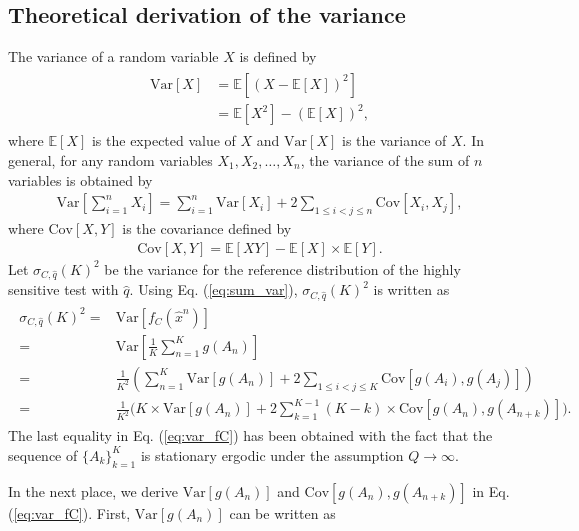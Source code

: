 \documentclass[dvipdfmx,english]{ampmt} %
\begin{document}
\subsection{Theoretical derivation of the variance}
The variance of a random variable $X$ is defined by
\begin{align}
\begin{split}\label{eq:var_def}
  \mathrm{Var}[X] &= \mathbb{E}[(X - \mathbb{E}[X])^2] \\
  &=\mathbb{E}[X^2] - (\mathbb{E}[X])^2,
\end{split}
\end{align}
where $\mathbb{E}[X]$ is the expected value of $X$ and $\mathrm{Var}[X]$ is the variance of $X$.
In general, for any random variables $X_1,X_2,\dots,X_n$, the variance of the sum of $n$ variables is obtained by
\begin{align}\label{eq:sum_var}
  \mathrm{Var}\left[\sum_{i=1}^{n} X_i \right] = \sum_{i=1}^{n} \mathrm{Var}[X_i] + 2 \sum_{1\leq i < j \leq n}\mathrm{Cov}[X_i, X_j],
\end{align}
where $\mathrm{Cov}[X,Y]$ is the covariance defined by
\begin{align}\label{eq:cov_def}
  \mathrm{Cov}[X, Y] = \mathbb{E}[XY] - \mathbb{E}[X] \times \mathbb{E}[Y].
\end{align}
Let $\sigma_{C,\hat{q}}(K)^2$ be the variance for the reference distribution of the highly sensitive test with $\hat{q}$.
Using Eq. (\ref{eq:sum_var}), $\sigma_{C,\hat{q}}(K)^2$ is written as
\begin{align}
\begin{split}\label{eq:var_fC}
  \sigma_{C,\hat{q}}(K)^2 =& \mathrm{Var} [f_C(\hat{x}^n)] \\
  =& \mathrm{Var} \left[ \frac{1}{K} \sum_{n=1}^{K} g(A_n) \right] \\
  =& \frac{1}{K^2} \left( \sum_{n=1}^{K} \mathrm{Var} [g(A_n)] + 2 \sum_{1 \leq i < j \leq K} \mathrm{Cov} [g(A_{i}), g(A_{j})] \right) \\
  =& \frac{1}{K^2} \Biggl( K \times \mathrm{Var} [g(A_n)] + 2\sum_{k=1}^{K-1}(K-k) \times \mathrm{Cov}[g(A_n),g(A_{n+k})] \Biggr).
\end{split}
\end{align}
The last equality in Eq. (\ref{eq:var_fC}) has been obtained with the fact that the sequence of $\{A_k\}_{k=1}^{K}$ is stationary ergodic under the assumption $Q\to\infty$.
\par
In the next place, we derive $\mathrm{Var} [g(A_n)]$ and $\mathrm{Cov}[g(A_n),g(A_{n+k})]$ in Eq. (\ref{eq:var_fC}). First, $\mathrm{Var} [g(A_n)]$ can be written as
\end{document}
